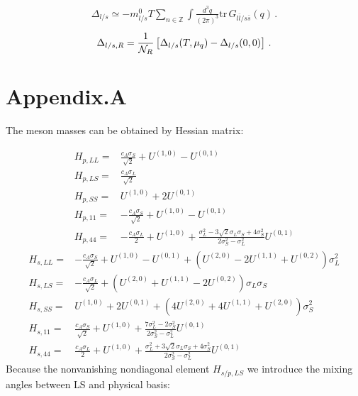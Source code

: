 \documentclass[12pt]{article}
\begin{document}
\begin{align}
  \Delta_{l/s}\simeq  - m_{l/s}^0
  T\sum_{n\in\mathbb{Z}} \int \frac{d^3 q}{(2 \pi)^3}
  \text{tr} \,G_{l\bar l/s \bar s} (q)\,. 
\end{align}
%
\begin{align}\label{eq:chiralcondren}
  \Delta_{l/s,R} = \frac{1}{{\cal N}_R}\left[\Delta_{l/s}(T,\mu_q) - 
  \Delta_{l/s}(0,0)\right]\,.
\end{align}
%
\section{Appendix.A}
The meson masses can be obtained by Hessian matrix:

\begin{align}
H_{p,LL}=&\frac{c_A \sigma_S}{\sqrt{2}}+U^{(1,0)}-U^{(0,1)}\\
H_{p,LS}=&\frac{c_A \sigma_L}{\sqrt{2}}\\
H_{p,SS}=&U^{(1,0)}+2 U^{(0,1)}\\
H_{p,11}=&-\frac{c_A \sigma_S}{\sqrt{2}}+U^{(1,0)}-U^{(0,1)}\\
H_{p,44}=&- \frac{c_A \sigma_L}{2} + U^{(1,0)} + \frac{\sigma_L^2- 3 \sqrt{2} \sigma_L \sigma_S+4 \sigma_S^2}{2 \sigma_S^2-\sigma_L^2} U^{(0,1)}
\end{align}
\begin{align}
H_{s,LL}=&-\frac{c_A \sigma_S}{\sqrt{2}}+U^{(1,0)}-U^{(0,1)} +(U^{(2,0)} -2U^{(1,1)}+U^{(0,2)})\sigma_L^2\\
H_{s,LS}=&-\frac{c_A \sigma_L}{\sqrt{2}}+(U^{(2,0)}+U^{(1,1)}-2U^{(0,2)}) \sigma_L \sigma_S\\
H_{s,SS}=&U^{(1,0)}+2 U^{(0,1)} +(4 U^{(2,0)}+4U^{(1,1)}+U^{(2,0)})\sigma_S^2 \\
H_{s,11}=&\frac{c_A \sigma_S}{\sqrt{2}}+U^{(1,0)} +\frac{7 \sigma_L^2 - 2 \sigma_S^2}{2 \sigma_S^2-\sigma_L^2}U^{(0,1)}\\
H_{s,44}=&\frac{c_A \sigma_L}{2}+U^{(1,0)}+\frac{\sigma_L^2+3 \sqrt{2} \sigma_L\sigma_S+4 \sigma_S^2}{2 \sigma_S^2-\sigma_L^2}U^{(0,1)}
\end{align}
Because the nonvanishing nondiagonal element $H_{s/p,LS}$
we introduce the mixing angles between LS and physical basis:
\end{document}
